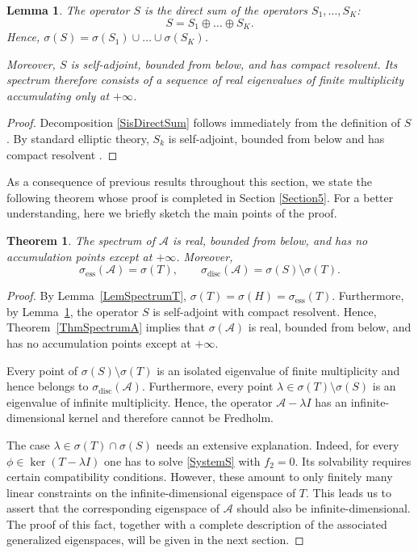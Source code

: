 \documentclass[reqno]{amsart}
\newtheorem{thm}{Theorem}
\newtheorem{lem}{Lemma}
\theoremstyle{definition}
\theoremstyle{remark}
\numberwithin{equation}{section}
\newcommand{\cA}{\mathcal{A}}
\begin{document}
\begin{lem}\label{LemSpectrumS}
The operator $S$ is the direct sum of the operators $S_1,\dots,S_K$:
\begin{equation}\label{SisDirectSum}
S=S_1\oplus\dots\oplus S_K.
\end{equation}
Hence, $\sigma(S)=\sigma(S_1)\cup\dots\cup\sigma(S_K)$.

Moreover, $S$ is self-adjoint, bounded from below, and has compact resolvent. Its spectrum therefore consists of a sequence of real eigenvalues of finite multiplicity accumulating only at $+\infty$.
\end{lem}
\begin{proof}
Decomposition \eqref{SisDirectSum} follows immediately from the definition of $S$. By standard elliptic theory, $S_k$ is self-adjoint, bounded from below and has compact resolvent \cite{EvansBook}.
\end{proof}


 As a consequence of previous results throughout this section, we state the following theorem whose proof is completed in Section \ref{Section5}. For a better understanding, here we briefly sketch the main points of the proof.
 
\begin{thm}\label{ThmEssSpectrumA}
The spectrum of $\cA$ is real, bounded from below, and has no accumulation points except at $+\infty$. Moreover,
\begin{equation*}
\sigma_{\mathrm{ess}}(\cA)=\sigma(T), \qquad \sigma_{\mathrm{disc}}(\cA)=\sigma(S)\setminus\sigma(T).
\end{equation*}
\end{thm}

\begin{proof}
By Lemma~\ref{LemSpectrumT}, $\sigma(T)=\sigma(H)=\sigma_{\mathrm{ess}}(T)$. Furthermore, by Lemma~\ref{LemSpectrumS}, the operator $S$ is self-adjoint with compact resolvent. Hence, Theorem~\ref{ThmSpectrumA} implies that $\sigma(\cA)$ is real, bounded from below, and has no accumulation points except at $+\infty$.

Every point of $\sigma(S)\setminus\sigma(T)$ is an isolated eigenvalue of finite multiplicity and hence belongs to $\sigma_{\mathrm{disc}}(\cA)$. Furthermore, every point $\lambda\in\sigma(T)\setminus\sigma(S)$ is an eigenvalue of infinite multiplicity. Hence, the operator $\cA-\lambda I$ has an infinite-dimensional kernel and therefore cannot be Fredholm. 

The case $\lambda\in\sigma(T)\cap\sigma(S)$ needs an extensive explanation. Indeed, for every $\phi\in\ker(T-\lambda I)$ one has to solve \eqref{SystemS} with $f_2=0$. Its solvability requires certain compatibility conditions. However, these amount to only finitely many linear constraints on the infinite-dimensional eigenspace of $T$. This leads us to assert that the corresponding eigenspace of $\cA$ should also be infinite-dimensional. The proof of this fact, together with a complete description of the associated generalized eigenspaces, will be given in the next section.
\end{proof}
\end{document}

